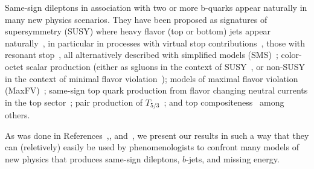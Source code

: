 Same-sign dileptons in association with two or more b-quarks appear naturally in many new physics scenarios.
They have been proposed as signatures of supersymmetry 
(SUSY) where heavy flavor (top or bottom) jets appear naturally~\cite{naturalness1,naturalness2,naturalness3,naturalness4},
in particular in processes with virtual stop contributions~\cite{stopVirtual,stopVirtualPRD},
those with resonant stop~\cite{stopReal},
all alternatively described with simplified models (SMS)~\cite{wacker}; 
color-octet scalar production (either as sgluons in the context of SUSY~\cite{sgluons},
or non-SUSY in the context of minimal flavor violation~\cite{colorOctetScalars}); 
models of maximal flavor violation (MaxFV)~\cite{mxflv1,mxflv2,mxflv3}; 
same-sign top quark production from flavor changing neutral currents in the top sector~\cite{fcnczprime};
pair production of $T_{5/3}$~\cite{t53};
and top compositeness~\cite{topcomp1,topcomp2,topcomp3}
among others.

As was done in References~\cite{sspaper2010},\cite{sspaper2011},
and~\cite{ssnote2011}, we present our results in such a way that 
they can (reletively) easily be used by phenomenologists to
confront many models of new physics that produces same-sign 
dileptons, $b$-jets, and missing energy.

